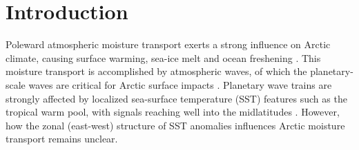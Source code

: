 \documentclass[draft]{agujournal2019}
\begin{document}
%
%

%


%
%
%
%


\section{Introduction}

Poleward atmospheric moisture transport exerts a strong influence on Arctic climate, causing surface warming, sea-ice melt and ocean freshening \cite{Doyle2011, Kapsch2013, Park2015, SerrezeBarry2014, Vihma2016, WoodsCaballero2016, Johansson2017, Liu2018}.  This moisture transport is accomplished by atmospheric waves, of which the planetary-scale waves are critical for Arctic surface impacts \cite{BaggettLee2015, GraversenBurtu2016, Heiskanen2020, Lee2019, PapritzDunnSigouin2020}. Planetary wave trains are strongly affected by localized sea-surface temperature (SST) features such as the tropical warm pool, with signals reaching well into the midlatitudes \cite{HorelWallace1981, PalmerMansfield1984, Ding2014}. However, how the zonal (east-west) structure of SST anomalies influences Arctic moisture transport remains unclear.
\end{document}
